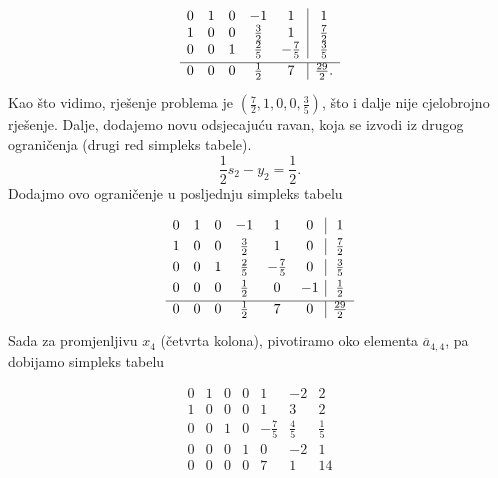 \documentclass[b5paper, utf8, 11pt, colorlinks]{book}
\theoremstyle{definition}
\begin{document}
$$
\begin{array}{ccccc|c}
    0    &  1  &   0 &   -1  &            1 & 1                  \\
    1    &  0  &  0 &    \frac{3}{2}  &  1 & \frac{7}{2}\\ \vspace{1mm}
    0    &  0  &  1  &   \frac{2}{5}    &  -\frac{7}{5} & \frac{3}{5}  \\ \hline \vspace{1mm}
    0    &  0  &  0   &    \frac{1}{2}  &  7  &    \frac{29}{2}
.\end{array}
$$
Kao što vidimo, rješenje problema je $(\frac{7}{2}, 1, 0, 0, \frac{3}{5})$, što i dalje nije cjelobrojno rješenje. Dalje, dodajemo novu odsjecajuću ravan, koja se izvodi iz drugog ograničenja (drugi red simpleks tabele).
$$ \frac{1}{2} s_2 - y_2 = \frac{1}{2}.$$
Dodajmo ovo ograničenje u posljednju simpleks tabelu

$$
\begin{array}{cccccc|c}\vspace{1mm}
    0    &  1  &   0 &   -1  &            1 & 0 & 1                  \\\vspace{1mm}
    1    &  0  &  0 &    \frac{3}{2}    &  1 & 0 &  \frac{7}{2}\\ \vspace{1mm}
    0    &  0  &  1  &   \frac{2}{5}    &  -\frac{7}{5} &  0 & \frac{3}{5}  \\\vspace{1mm}
    0    & 0   &  0  &   \frac{1}{2}    & 0     & -1 & \frac{1}{2} \\ \hline\vspace{1mm} 
    0    &  0  &  0   &    \frac{1}{2}  &  7  &   0 &  \frac{29}{2}
\end{array}
$$
Sada za promjenljivu $x_4$ (četvrta kolona), pivotiramo oko elementa $\overline{a}_{4,4}$, pa dobijamo simpleks tabelu 

$$
\begin{array}{cccccc|c}
0 &  1   &  0  &  0  &    1             &    -2           &   2         \\
1 &  0   &  0  &  0  &    1             &     3           &   2         \\
0 &  0   &  1  &  0  &   -\frac{7}{5}   &     \frac{4}{5} &   \frac{1}{5}\\
0 &  0   &  0  &  1  &   0              &    -2           &   1   \\ \hline
0 &  0   &  0  &  0  &   7              &     1           &   14
\end{array}
$$
\end{document}
